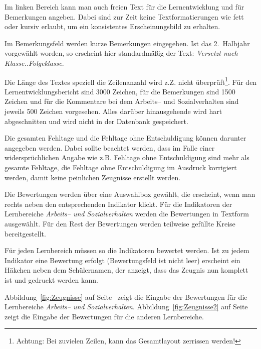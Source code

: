 \documentclass[a4paper,notitlepage,parskip]{scrartcl}
\newcommand\ott{\normalfont\ttfamily}
\begin{document}
Im linken Bereich kann man auch freien Text für die Lernentwicklung und für Bemerkungen angeben. Dabei sind zur Zeit keine Textformatierungen wie fett oder kursiv erlaubt, um ein konsistentes Erscheinungsbild zu erhalten.

Im Bemerkungsfeld werden kurze Bemerkungen eingegeben.
Ist das 2.~Halbjahr vorgewählt worden, so erscheint hier standardmäßig der Text: \emph{Versetzt nach Klasse..{\ott Folgeklasse}}.

Die Länge des Textes speziell die Zeilenanzahl wird z.Z. nicht überprüft\footnote{Achtung: Bei zuvielen Zeilen, kann das Gesamtlayout zerrissen werden!}. Für den Lernentwicklungsbericht sind 3000 Zeichen, für die Bemerkungen sind 1500 Zeichen und für die Kommentare bei dem Arbeits-- und Sozialverhalten sind jeweils 500 Zeichen vorgesehen. Alles darüber hinausgehende wird hart abgeschnitten und wird nicht in der Datenbank gespeichert.

Die gesamten Fehltage und die Fehltage ohne Entschuldigung können darunter angegeben werden.
Dabei sollte beachtet werden, dass im Falle einer widersprüchlichen Angabe wie z.B. Fehltage ohne Entschuldigung sind mehr als gesamte Fehltage, die Fehltage ohne Entschuldigung im Ausdruck korrigiert werden, damit keine peinlichen Zeugnisse erstellt werden. 

Die Bewertungen werden über eine Auswahlbox gewählt, die erscheint, wenn man rechts neben den entsprechenden Indikator klickt. Für die Indikatoren der Lernbereiche \emph{Arbeits-- und Sozialverhalten} werden die Bewertungen in Textform ausgewählt. Für den Rest der Bewertungen werden teilweise gefüllte Kreise bereitgestellt.

Für jeden Lernbereich müssen so die Indikatoren bewertet werden.
Ist zu jedem Indikator eine Bewertung erfolgt (Bewertungsfeld ist nicht leer) erscheint ein Häkchen neben dem Schülernamen, der anzeigt, dass das Zeugnis nun komplett ist und gedruckt werden kann.

Abbildung~\ref{fig:Zeugnisse} auf Seite~\pageref{fig:Zeugnisse} zeigt die Eingabe der Bewertungen für die Lernbereiche \emph{Arbeits-- und Sozialverhalten}.
Abbildung~\ref{fig:Zeugnisse2} auf Seite~\pageref{fig:Zeugnisse2} zeigt die Eingabe der Bewertungen für die anderen Lernbereiche.
\end{document}
